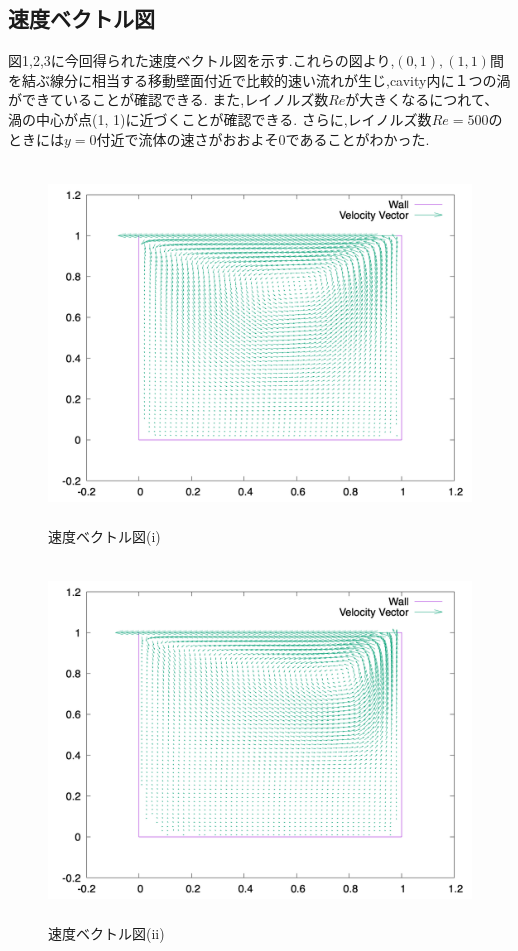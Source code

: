 \documentclass[upLaTeX,a4paper]{jsarticle}
\begin{document}
\subsection{速度ベクトル図}
図1,2,3に今回得られた速度ベクトル図を示す.これらの図より,$(0,1),(1,1)$間を結ぶ線分に相当する移動壁面付近で比較的速い流れが生じ,cavity内に１つの渦ができていることが確認できる.
また,レイノルズ数$Re$が大きくなるにつれて、渦の中心が点(1, 1)に近づくことが確認できる.
さらに,レイノルズ数$Re=500$のときには$y=0$付近で流体の速さがおおよそ0であることがわかった.
\begin{figure}[H]
  \centering
  \includegraphics[height=9.5cm]{outputs/img/velocity_vector_re50.png}
  \caption{速度ベクトル図(i)}
  \label{fig:velocity_vector_re50}
\end{figure}
\begin{figure}[H]
  \centering
  \includegraphics[height=9.5cm]{outputs/img/velocity_vector_re200.png}
  \caption{速度ベクトル図(ii)}
  \label{fig:velocity_vector_re200}
\end{figure}
\end{document}
